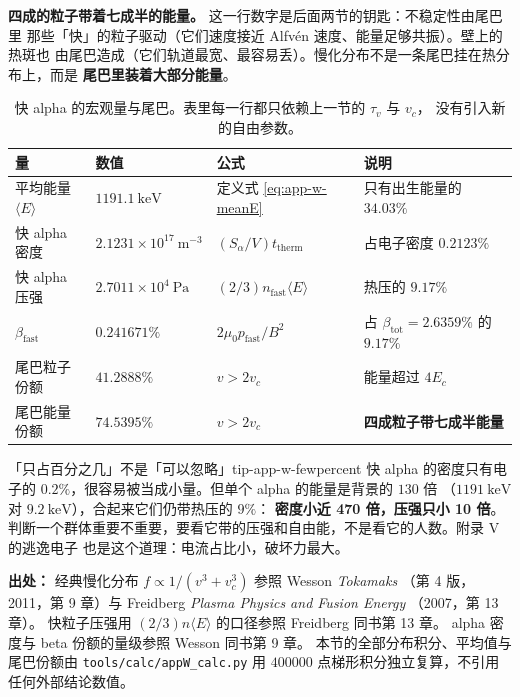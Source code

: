 \textbf{四成的粒子带着七成半的能量。} 这一行数字是后面两节的钥匙：不稳定性由尾巴里
那些「快」的粒子驱动（它们速度接近 Alfvén 速度、能量足够共振）。壁上的热斑也
由尾巴造成（它们轨道最宽、最容易丢）。慢化分布不是一条尾巴挂在热分布上，而是
\textbf{尾巴里装着大部分能量}。

\begin{table}[htbp]
\centering
\caption{快 alpha 的宏观量与尾巴。表里每一行都只依赖上一节的 $\tau_v$ 与 $v_c$，
没有引入新的自由参数。}
\label{tab:app-w-tail}
\begin{tabular}{@{}p{3.2cm}p{2.6cm}p{2.9cm}p{3.6cm}@{}}
\hline
量 & 数值 & 公式 & 说明 \\
\hline
平均能量 $\langle E\rangle$ & $1191.1\ \mathrm{keV}$ &
定义式 \eqref{eq:app-w-meanE} & 只有出生能量的 $34.03\%$ \\
快 alpha 密度 & $2.1231\times10^{17}\ \mathrm{m^{-3}}$ &
$(S_\alpha/V)t_{\text{therm}}$ & 占电子密度 $0.2123\%$ \\
快 alpha 压强 & $2.7011\times10^{4}\ \mathrm{Pa}$ &
$(2/3)n_{\text{fast}}\langle E\rangle$ & 热压的 $9.17\%$ \\
$\beta_{\text{fast}}$ & $0.241671\%$ & $2\mu_0p_{\text{fast}}/B^2$ &
占 $\beta_{\text{tot}}=2.6359\%$ 的 $9.17\%$ \\
尾巴粒子份额 & $41.2888\%$ & $v>2v_c$ & 能量超过 $4E_c$ \\
尾巴能量份额 & $74.5395\%$ & $v>2v_c$ & \textbf{四成粒子带七成半能量} \\
\hline
\end{tabular}

\end{table}

\begin{tip}{「只占百分之几」不是「可以忽略」}{tip-app-w-fewpercent}
快 alpha 的密度只有电子的 $0.2\%$，很容易被当成小量。但单个 alpha 的能量是背景的 $130$ 倍
（$1191\ \mathrm{keV}$ 对 $9.2\ \mathrm{keV}$），合起来它们仍带热压的 $9\%$：
\textbf{密度小近 470 倍，压强只小 10 倍}。
判断一个群体重要不重要，要看它带的压强和自由能，不是看它的人数。附录 V 的逃逸电子
也是这个道理：电流占比小，破坏力最大。
\end{tip}

{\footnotesize
\textbf{出处：} 经典慢化分布 $f\propto 1/(v^3+v_c^3)$ 参照 Wesson \textit{Tokamaks}
（第 4 版，2011，第 9 章）与 Freidberg \textit{Plasma Physics and Fusion Energy}
（2007，第 13 章）。
快粒子压强用 $(2/3)n\langle E\rangle$ 的口径参照
Freidberg 同书第 13 章。
alpha 密度与 beta 份额的量级参照 Wesson 同书第 9 章。
本节的全部分布积分、平均值与尾巴份额由 \texttt{tools/\allowbreak{}calc/\allowbreak{}appW\_calc.py} 用
$400000$ 点梯形积分独立复算，不引用任何外部结论数值。
}

